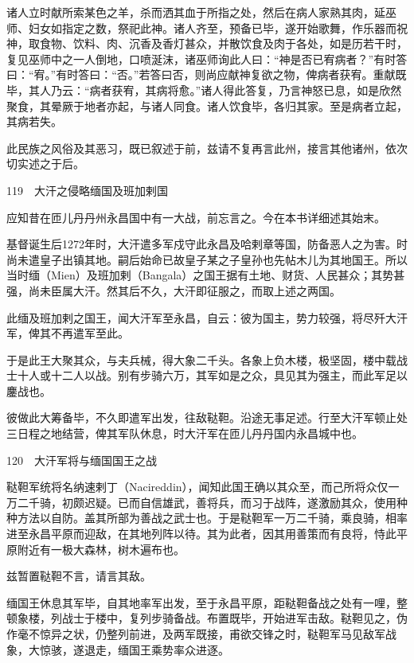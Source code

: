 \documentclass[12pt,UTF8]{ctexbook}
\begin{document}
诸人立时献所索某色之羊，杀而洒其血于所指之处，然后在病人家熟其肉，延巫师、妇女如指定之数，祭祀此神。诸人齐至，预备已毕，遂开始歌舞，作乐器而祝神，取食物、饮料、肉、沉香及香灯甚众，并散饮食及肉于各处，如是历若干时，复见巫师中之一人倒地，口喷涎沫，诸巫师询此人曰：“神是否已宥病者？”有时答曰：“宥。”有时答曰：“否。”若答曰否，则尚应献神复欲之物，俾病者获宥。重献既毕，其人乃云：“病者获宥，其病将愈。”诸人得此答复，乃言神怒已息，如是欣然聚食，其晕厥于地者亦起，与诸人同食。诸人饮食毕，各归其家。至是病者立起，其病若失。

此民族之风俗及其恶习，既已叙述于前，兹请不复再言此州，接言其他诸州，依次切实述之于后。





119　大汗之侵略缅国及班加剌国

应知昔在匝儿丹丹州永昌国中有一大战，前忘言之。今在本书详细述其始末。

基督诞生后1272年时，大汗遣多军戍守此永昌及哈剌章等国，防备恶人之为害。时尚未遣皇子出镇其地。嗣后始命已故皇子某之子皇孙也先帖木儿为其地国王。所以当时缅（Mien）及班加剌（Bangala）之国王据有土地、财货、人民甚众；其势甚强，尚未臣属大汗。然其后不久，大汗即征服之，而取上述之两国。

此缅及班加剌之国王，闻大汗军至永昌，自云：彼为国主，势力较强，将尽歼大汗军，俾其不再遣军至此。

于是此王大聚其众，与夫兵械，得大象二千头。各象上负木楼，极坚固，楼中载战士十人或十二人以战。别有步骑六万，其军如是之众，具见其为强主，而此军足以鏖战也。

彼做此大筹备毕，不久即遣军出发，往敌鞑靼。沿途无事足述。行至大汗军顿止处三日程之地结营，俾其军队休息，时大汗军在匝儿丹丹国内永昌城中也。





120　大汗军将与缅国国王之战

鞑靼军统将名纳速剌丁（Nacireddin），闻知此国王确以其众至，而己所将众仅一万二千骑，初颇迟疑。已而自信雄武，善将兵，而习于战阵，遂激励其众，使用种种方法以自防。盖其所部为善战之武士也。于是鞑靼军一万二千骑，乘良骑，相率进至永昌平原而迎敌，在其地列阵以待。其为此者，因其用善策而有良将，恃此平原附近有一极大森林，树木遍布也。

兹暂置鞑靼不言，请言其敌。

缅国王休息其军毕，自其地率军出发，至于永昌平原，距鞑靼备战之处有一哩，整顿象楼，列战士于楼中，复列步骑备战。布置既毕，开始进军击敌。鞑靼见之，伪作毫不惊异之状，仍整列前进，及两军既接，甫欲交锋之时，鞑靼军马见敌军战象，大惊骇，遂退走，缅国王乘势率众进逐。
\end{document}

